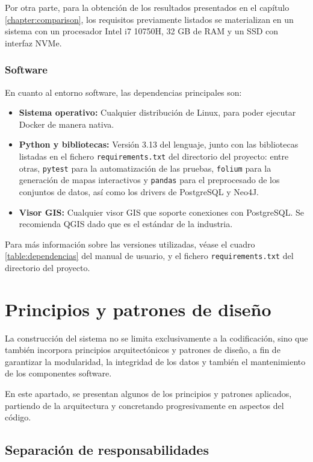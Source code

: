 Por otra parte, para la obtención de los resultados presentados en el capítulo \ref{chapter:comparison}, los requisitos previamente listados se materializan en un sistema con un procesador Intel i7 10750H, 32 GB de RAM y un SSD con interfaz NVMe.

\subsubsection{Software}

En cuanto al entorno software, las dependencias principales son:

\begin{itemize}
    \item \textbf{Sistema operativo:} Cualquier distribución de Linux, para poder ejecutar Docker de manera nativa.
    \item \textbf{Python y bibliotecas:} Versión 3.13 del lenguaje, junto con las bibliotecas listadas en el fichero \texttt{requirements.txt} del directorio del proyecto: entre otras, \texttt{pytest}\cite{pytest} para la automatización de las pruebas, \texttt{folium}\cite{folium} para la generación de mapas interactivos y \texttt{pandas}\cite{pandas} para el preprocesado de los conjuntos de datos, así como los drivers de PostgreSQL y Neo4J.
    \item \textbf{Visor GIS:} Cualquier visor GIS que soporte conexiones con PostgreSQL. Se recomienda QGIS\cite{qgis} dado que es el estándar de la industria.
\end{itemize}

Para más información sobre las versiones utilizadas, véase el cuadro \ref{table:dependencias} del manual de usuario, y el fichero \texttt{requirements.txt} del directorio del proyecto.

\section{Principios y patrones de diseño}

La construcción del sistema no se limita exclusivamente a la codificación, sino que también incorpora principios arquitectónicos y patrones de diseño, a fin de garantizar la modularidad, la integridad de los datos y también el mantenimiento de los componentes software.

En este apartado, se presentan algunos de los principios y patrones aplicados, partiendo de la arquitectura y concretando progresivamente en aspectos del código.

\subsection{Separación de responsabilidades}

